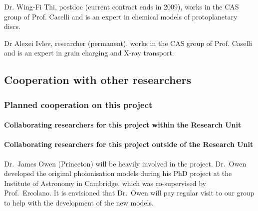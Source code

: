 \documentclass[10pt,fleqn,twoside]{article}
\begin{document}
Dr. Wing-Fi Thi, postdoc (current contract ends in 2009), works in the CAS group of Prof. Caselli and
is an expert in chemical models of protoplanetary discs. 

Dr Alexei Ivlev, researcher (permanent), works in the CAS  group of Prof. Caselli and
is an expert in grain charging and X-ray transport. 

\subsection{Cooperation with other researchers}

\subsubsection{Planned cooperation on this project}

\paragraph{Collaborating researchers for this project within the
  Research Unit}


\paragraph{Collaborating researchers for this project outside of
  the Research Unit}
Dr.\ James Owen (Princeton) will be heavily involved in the
project. Dr.\ Owen developed the original
phoionisation models during his PhD project at the Institute of
Astronomy in Cambridge, which was co-supervised by
Prof.\ Ercolano. It is envisioned that Dr.\ Owen will pay regular visit
to our group to help with the development of the new models. 
\end{document}
